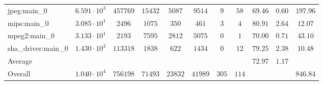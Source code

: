 \begin{tabular}{|l|c|c|c|c|c|c|c|c|c|c|}
jpeg:main\_0            & $ 6.591 \cdot 10^{3} $ & $ 457769 $ & $ 15432 $ & $ 5087  $ & $ 9514  $ & $ 9   $ & $ 58  $ & $ 69.46       $ & $ 0.60    $ & $ 197.96  $ \\
mips:main\_0            & $ 3.085 \cdot 10^{1} $ & $ 2496   $ & $ 1075  $ & $ 350   $ & $ 461   $ & $ 3   $ & $ 4   $ & $ 80.91       $ & $ 2.64    $ & $ 12.07   $ \\
mpeg2:main\_0           & $ 3.133 \cdot 10^{1} $ & $ 2193   $ & $ 7595  $ & $ 2812  $ & $ 5075  $ & $ 0   $ & $ 1   $ & $ 70.00       $ & $ 0.71    $ & $ 43.10   $ \\
sha\_driver:main\_0     & $ 1.430 \cdot 10^{3} $ & $ 113318 $ & $ 1838  $ & $ 622   $ & $ 1434  $ & $ 0   $ & $ 12  $ & $ 79.25       $ & $ 2.38    $ & $ 10.48   $ \\
\hline
Average                 & $                    $ & $        $ & $       $ & $       $ & $       $ & $     $ & $     $ & $ 72.97       $ & $ 1.17    $ & $         $ \\
\hline
Overall                 & $ 1.040 \cdot 10^{4} $ & $ 756198 $ & $ 71493 $ & $ 23832 $ & $ 41989 $ & $ 305 $ & $ 114 $ & $             $ & $         $ & $ 846.84  $ \\
\hline
\end{tabular}
